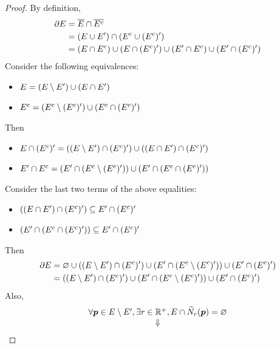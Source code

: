 \begin{proof}
    By definition,
    \begin{align*}
        \partial E &= \overline{E} \cap \overline{E^{c}} \\
        &= \paren*{E \cup E'} \cap \paren*{E^{c} \cup (E^{c})'} \\
        &= \paren*{E \cap E^{c}} \cup \paren*{E \cap (E^{c})'}
        \cup \paren*{E' \cap E^{c}} \cup \paren*{E' \cap (E^{c})'}
    \end{align*}
    Consider the following equivalences:
    \begin{itemize}
        \item $E = \paren*{E \setminus E'} \cup \paren*{E \cap E'}$
        \item $E^{c} = \paren*{E^{c} \setminus (E^{c})'} \cup \paren*{E^{c} \cap (E^{c})'}$
    \end{itemize}
    Then
    \begin{itemize}
        \item $E \cap (E^{c})' = \paren*{\paren*{E \setminus E'} \cap (E^{c})'}
        \cup \paren*{\paren*{E \cap E'} \cap (E^{c})'}$
        \item $E' \cap E^{c} = \paren*{E' \cap \paren*{E^{c} \setminus (E^{c})'}}
        \cup \paren*{E' \cap \paren*{E^{c} \cap (E^{c})'}}$
    \end{itemize}
    Consider the last two terms of the above equalities:
    \begin{itemize}
        \item $\paren*{\paren*{E \cap E'} \cap (E^{c})'} \subseteq E' \cap (E^{c})'$
        \item $\paren*{E' \cap \paren*{E^{c} \cap (E^{c})'}} \subseteq E' \cap (E^{c})'$
    \end{itemize}
    Then
    \begin{align*}
        \partial E &= \vnot \cup \paren*{\paren*{E \setminus E'} \cap (E^{c})'}
        \cup \paren*{E' \cap \paren*{E^{c} \setminus (E^{c})'}} \cup \paren*{E' \cap (E^{c})'} \\
        &= \paren*{\paren*{E \setminus E'} \cap (E^{c})'}
        \cup \paren*{E' \cap \paren*{E^{c} \setminus (E^{c})'}} \cup \paren*{E' \cap (E^{c})'}
    \end{align*}
    Also,
    \[
    \begin{array}{c}
        \forall \bm{p} \in E \setminus E', \exists r \in \R^{+}, E \cap \widetilde{N}_{r}(\bm{p}) = \vnot \\
        \Downarrow \\

\end{array}\]
\end{proof}
